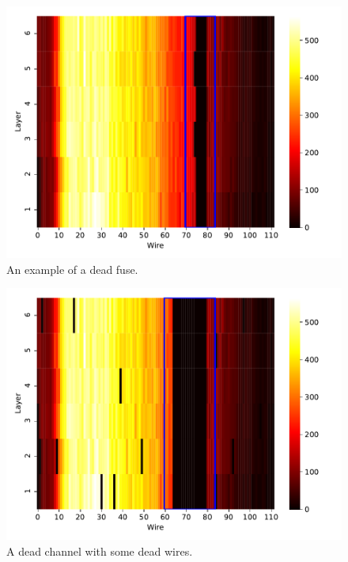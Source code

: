 \begin{figure}
  \centering
  \includegraphics[width=\textwidth]{../figures/dead_fuse}
  \caption{An example of a dead fuse.}
  \label{fig:dead-fuse}
\end{figure}

\begin{figure}
  \centering
  \includegraphics[width=\textwidth]{../figures/dead_channel}
  \caption{A dead channel with some dead wires.}
  \label{fig:dead-channel}
\end{figure}

